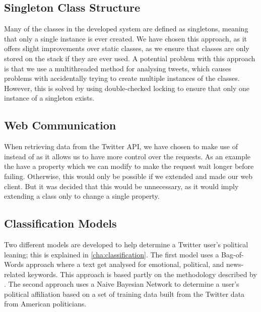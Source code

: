 \subsection{Singleton Class Structure}
Many of the classes in the developed system are defined as singletons, meaning
that only a single instance is ever created. We have chosen this approach, as it
offers slight improvements over static classes, as we ensure that classes are
only stored on the stack if they are ever used. A potential problem with this
approach is that we use a multithreaded method for analysing tweets, which
causes problems with accidentally trying to create multiple instances of the
classes. However, this is solved by using double-checked locking to ensure that
only one instance of a singleton exists.

\subsection{Web Communication}
When retrieving data from the Twitter API, we have chosen to make use of
 instead of  as it allows us to have more
control over the requests. As an example the  have a
 property which we can modify to make the request wait longer
before failing. Otherwise, this would only be possible if we extended
 and made our web client. But it was decided that this would be
unnecessary, as it would imply extending a class only to change a single
property.

\subsection{Classification Models}
Two different models are developed to help determine a Twitter user's political
leaning; this is explained in \autoref{cha:classification}. The first model uses
a Bag-of-Words approach where a text get analysed for emotional, political, and
news-related keywords. This approach is based partly on the methodology
described by .
The second approach uses a Naive Bayesian Network to determine a user's
political affiliation based on a set of training data built from the Twitter
data from American politicians.




